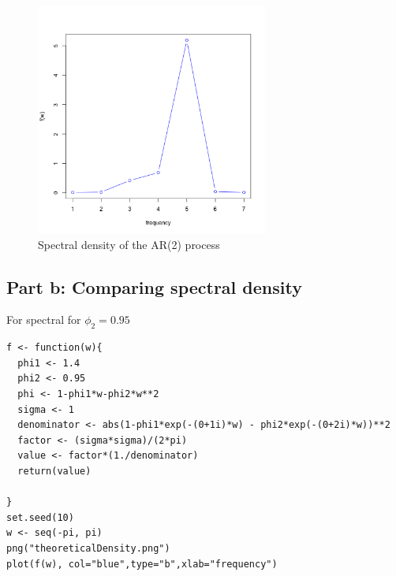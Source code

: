 \documentclass[11pt, oneside]{article}   	%
\begin{document}
\begin{figure}[H] %
   \centering
   \includegraphics[width=3in]{../code/theoreticalDensity.png} 
   \caption{Spectral density of the AR(2) process}
   \label{fig:sd}
\end{figure}

\subsection{Part b: Comparing spectral density}
For spectral for $\phi_{2}=0.95$
 \begin{lstlisting}
f <- function(w){
  phi1 <- 1.4
  phi2 <- 0.95
  phi <- 1-phi1*w-phi2*w**2
  sigma <- 1
  denominator <- abs(1-phi1*exp(-(0+1i)*w) - phi2*exp(-(0+2i)*w))**2
  factor <- (sigma*sigma)/(2*pi)
  value <- factor*(1./denominator)
  return(value)

}
set.seed(10)
w <- seq(-pi, pi)
png("theoreticalDensity.png")
plot(f(w), col="blue",type="b",xlab="frequency")
\end{lstlisting}
\end{document}
